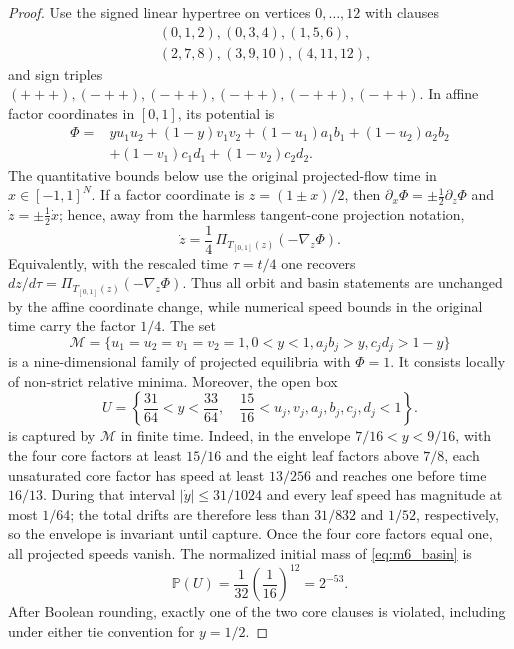 \documentclass[11pt,a4paper]{article}
\begin{document}
\begin{proof}
Use the signed linear hypertree on vertices $0,\ldots,12$ with clauses
\begin{equation}
\begin{split}
 &(0,1,2),(0,3,4),(1,5,6),\\
 &(2,7,8),(3,9,10),(4,11,12),
\end{split}
\end{equation}
and sign triples $(+++),(-++),(-++),(-++),(-++),(-++)$.  In affine factor
coordinates in $[0,1]$, its potential is
\begin{equation}
\begin{split}
\Phi={}&yu_1u_2+(1-y)v_1v_2
 +(1-u_1)a_1b_1+(1-u_2)a_2b_2\\
 &+(1-v_1)c_1d_1+(1-v_2)c_2d_2.
\end{split}
\label{eq:m6_phi}
\end{equation}
The quantitative bounds below use the original projected-flow time in
$x\in[-1,1]^N$.  If a factor coordinate is
$z=(1\pm x)/2$, then
$\partial_x\Phi=\pm\tfrac12\partial_z\Phi$ and
$\dot z=\pm\tfrac12\dot x$; hence, away from the harmless tangent-cone
projection notation,
\[
\dot z=\frac14\,\Pi_{T_{[0,1]}(z)}(-\nabla_z\Phi).
\]
Equivalently, with the rescaled time $\tau=t/4$ one recovers
$dz/d\tau=\Pi_{T_{[0,1]}(z)}(-\nabla_z\Phi)$.  Thus all orbit and basin
statements are unchanged by the affine coordinate change, while numerical
speed bounds in the original time carry the factor $1/4$.
The set
\begin{equation}
\mathcal M=\{u_1=u_2=v_1=v_2=1, 0<y<1,
 a_jb_j>y, c_jd_j>1-y\}
\end{equation}
is a nine-dimensional family of projected equilibria with $\Phi=1$.  It
consists locally of non-strict relative minima.  Moreover, the open box
\begin{equation}
U=\left\{\frac{31}{64}<y<\frac{33}{64},\quad
\frac{15}{16}<u_j,v_j,a_j,b_j,c_j,d_j<1\right\}.
\label{eq:m6_basin}
\end{equation}
is captured by $\mathcal M$ in finite time.  Indeed, in the envelope
$7/16<y<9/16$, with the four core factors at least $15/16$ and the eight leaf
factors above $7/8$, each unsaturated core factor has speed at least $13/256$
and reaches one before time $16/13$.  During that interval
$|\dot y|\le31/1024$ and every leaf speed has magnitude at most $1/64$; the
total drifts are therefore less than $31/832$ and $1/52$, respectively, so
the envelope is invariant until capture.  Once the four core factors equal
one, all projected speeds vanish.  The normalized initial mass of
\eqref{eq:m6_basin} is
\begin{equation}
\mathbb P(U)=\frac1{32}\left(\frac1{16}\right)^{12}=2^{-53}.
\end{equation}
After Boolean rounding, exactly one of the two core clauses is violated,
including under either tie convention for $y=1/2$.


\end{proof}
\end{document}

